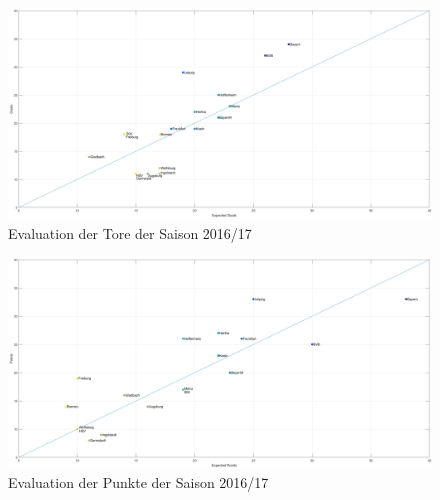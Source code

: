 \begin{figure}
\centering
\includegraphics[scale=0.3]{se-wa-jpg/goals_correlation_16_17}
\caption{Evaluation der Tore der Saison 2016/17}
\label{lines}
\end{figure}

\begin{figure}
\centering
\includegraphics[scale=0.3]{se-wa-jpg/points_correlation_16_17}
\caption{Evaluation der Punkte der Saison 2016/17}
\label{lines}
\end{figure}



